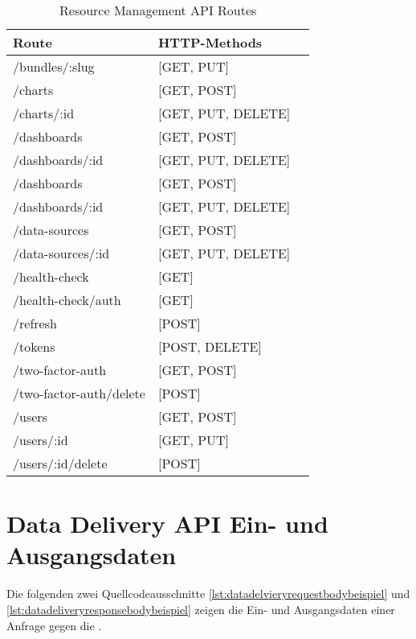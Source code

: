 \begin{table}[h]
\begin{center}
\begin{tabular}{llc}
Route & HTTP-Methods \\
\hline
/bundles/:slug          & [GET, PUT]         \\
/charts                 & [GET, POST]        \\
/charts/:id             & [GET, PUT, DELETE] \\
/dashboards             & [GET, POST]        \\
/dashboards/:id         & [GET, PUT, DELETE] \\
/dashboards             & [GET, POST]        \\
/dashboards/:id         & [GET, PUT, DELETE] \\
/data-sources           & [GET, POST]        \\
/data-sources/:id       & [GET, PUT, DELETE] \\
/health-check           & [GET]              \\
/health-check/auth      & [GET]              \\
/refresh                & [POST]             \\
/tokens                 & [POST, DELETE]     \\
/two-factor-auth        & [GET, POST]        \\
/two-factor-auth/delete & [POST]             \\
/users                  & [GET, POST]        \\
/users/:id              & [GET, PUT]         \\
/users/:id/delete       & [POST]             \\
\end{tabular}
\end{center}
\caption{Resource Management API Routes}
\label{tab:resourcemanagementapiroutes}
\end{table}

\newpage

\section*{Data Delivery API Ein- und Ausgangsdaten}
\label{sec:datadeliveryapieinundausgangsdaten}

Die folgenden zwei Quellcodeausschnitte \ref{lst:datadelvieryrequestbodybeispiel}
und \ref{lst:datadeliveryresponsebodybeispiel} zeigen die Ein- und
Ausgangsdaten einer Anfrage gegen die .

